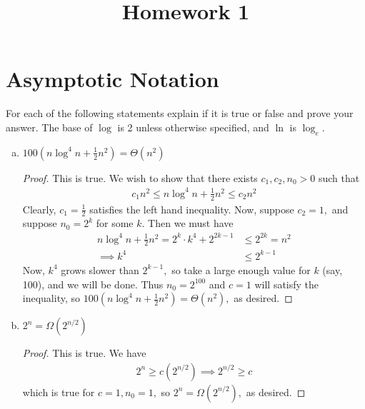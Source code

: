 \documentclass{article}
\begin{document}
\title{Homework 1}
\maketitle
\thispagestyle{fancy}

\section{Asymptotic Notation}

For each of the following statements explain if it is true or false and prove your answer. The base of $\log$ is 2 unless otherwise specified, and $\ln$ is $\log_e.$

\begin{enumerate}[(a)]
	\item $100(n\log^4 n+\frac{1}{2}n^2)=\Theta(n^2)$
		\begin{proof}
			This is true. We wish to show that there exists $c_1, c_2, n_0>0$ such that
			\begin{align*}
				c_1n^2\le n\log^4n+\frac{1}{2}n^2\le c_2n^2
			\end{align*}
			Clearly, $c_1=\frac{1}{2}$ satisfies the left hand inequality. Now, suppose $c_2=1,$ and suppose $n_0=2^k$ for some $k.$ Then we must have
			\begin{align*}
				n\log^4n+\frac{1}{2}n^2 = 2^k\cdot k^4 + 2^{2k-1}&\le 2^{2k} = n^2 \\
				\implies k^4 &\le 2^{k-1}
			\end{align*}
			Now, $k^4$ grows slower than $2^{k-1},$ so take a large enough value for $k$ (say, 100), and we will be done. Thus $n_0=2^{100}$ and $c=1$ will satisfy the inequality, so $100\left( n\log^4n + \frac{1}{2} n^2 \right) = \Theta(n^2),$ as desired.	
		\end{proof}

	\item $2^n=\Omega(2^{n/2})$
		\begin{proof}
			This is true. We have
			\begin{align*}
				2^n \ge c(2^{n/2}) \implies 2^{n/2}\ge c
			\end{align*}
			which is true for $c=1, n_0=1,$ so $2^n=\Omega(2^{n/2}),$ as desired.
		\end{proof}


\end{enumerate}
\end{document}
